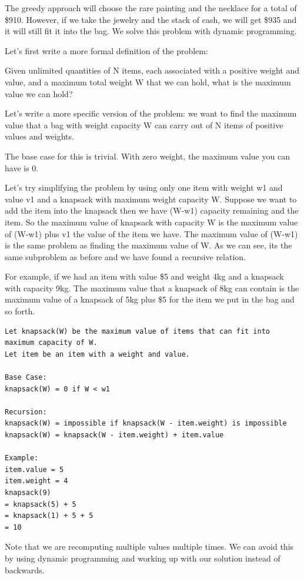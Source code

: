 \documentclass[11pt,oneside]{book}
\begin{document}
The greedy approach will choose the rare painting and the necklace for a total of \$910. However, if we take the jewelry and the stack of cash, we will get \$935 and it will still fit it into the bag. We solve this problem with dynamic programming.

Let's first write a more formal definition of the problem:

Given unlimited quantities of N items, each associated with a positive weight and value, and a maximum total weight W that we can hold, what is the maximum value we can hold?

Let's write a more specific version of the problem: we want to find the maximum value that a bag with weight capacity W can carry out of N items of positive values and weights.

The base case for this is trivial. With zero weight, the maximum value you can have is 0.

Let's try simplifying the problem by using only one item with weight w1 and value v1 and a knapsack with maximum weight capacity W. Suppose we want to add the item into the knapsack then we have (W-w1) capacity remaining and the item. So the maximum value of knapsack with capacity W is the maximum value of (W-w1) plus v1 the value of the item we have. The maximum value of (W-w1) is the same problem as finding the maximum value of W. As we can see, its the same subproblem as before and we have found a recursive relation.

For example, if we had an item with value \$5 and weight 4kg and a knapsack with capacity 9kg. The maximum value that a knapsack of 8kg can contain is the maximum value of a knapsack of 5kg plus \$5 for the item we put in the bag and so forth.

\begin{lstlisting}
Let knapsack(W) be the maximum value of items that can fit into maximum capacity of W.
Let item be an item with a weight and value.

Base Case:
knapsack(W) = 0 if W < w1

Recursion:
knapsack(W) = impossible if knapsack(W - item.weight) is impossible
knapsack(W) = knapsack(W - item.weight) + item.value

Example:
item.value = 5
item.weight = 4
knapsack(9)
= knapsack(5) + 5
= knapsack(1) + 5 + 5
= 10
\end{lstlisting}

Note that we are recomputing multiple values multiple times. We can avoid this by using dynamic programming and working up with our solution instead of backwards.
\end{document}
